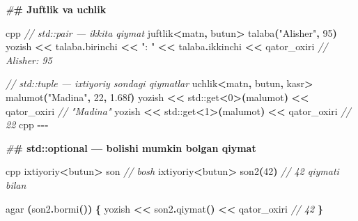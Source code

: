 \documentclass[a4paper,11pt,twoside,openright]{book}
\newenvironment{Shaded}{\begin{snugshade}}{\end{snugshade}}
\newcommand{\BuiltInTok}[1]{#1}
\newcommand{\CommentTok}[1]{\textcolor[rgb]{0.56,0.35,0.01}{\textit{#1}}}
\newcommand{\DecValTok}[1]{\textcolor[rgb]{0.00,0.00,0.81}{#1}}
\newcommand{\ErrorTok}[1]{\textcolor[rgb]{0.64,0.00,0.00}{\textbf{#1}}}
\newcommand{\FloatTok}[1]{\textcolor[rgb]{0.00,0.00,0.81}{#1}}
\newcommand{\NormalTok}[1]{#1}
\newcommand{\OperatorTok}[1]{\textcolor[rgb]{0.81,0.36,0.00}{\textbf{#1}}}
\newcommand{\PreprocessorTok}[1]{\textcolor[rgb]{0.56,0.35,0.01}{\textit{#1}}}
\newcommand{\StringTok}[1]{\textcolor[rgb]{0.31,0.60,0.02}{#1}}
\begin{document}
\begin{Shaded}
\begin{Highlighting}[]
\PreprocessorTok{\#}\ErrorTok{\# Juftlik va uchlik}

\ErrorTok{\textasciigrave{}\textasciigrave{}\textasciigrave{}}\NormalTok{cpp}
\CommentTok{// std::pair — ikkita qiymat}
\NormalTok{juftlik}\OperatorTok{\textless{}}\NormalTok{matn}\OperatorTok{,}\NormalTok{ butun}\OperatorTok{\textgreater{}}\NormalTok{ talaba}\OperatorTok{(}\StringTok{"Alisher"}\OperatorTok{,} \DecValTok{95}\OperatorTok{)}
\NormalTok{yozish }\OperatorTok{\textless{}\textless{}}\NormalTok{ talaba}\OperatorTok{.}\NormalTok{birinchi }\OperatorTok{\textless{}\textless{}} \StringTok{": "} \OperatorTok{\textless{}\textless{}}\NormalTok{ talaba}\OperatorTok{.}\NormalTok{ikkinchi }\OperatorTok{\textless{}\textless{}}\NormalTok{ qator\_oxiri}
\CommentTok{// Alisher: 95}

\CommentTok{// std::tuple — ixtiyoriy sondagi qiymatlar}
\NormalTok{uchlik}\OperatorTok{\textless{}}\NormalTok{matn}\OperatorTok{,}\NormalTok{ butun}\OperatorTok{,}\NormalTok{ kasr}\OperatorTok{\textgreater{}}\NormalTok{ malumot}\OperatorTok{(}\StringTok{"Madina"}\OperatorTok{,} \DecValTok{22}\OperatorTok{,} \FloatTok{1.68}\BuiltInTok{f}\OperatorTok{)}
\NormalTok{yozish }\OperatorTok{\textless{}\textless{}} \BuiltInTok{std::}\NormalTok{get}\OperatorTok{\textless{}}\DecValTok{0}\OperatorTok{\textgreater{}(}\NormalTok{malumot}\OperatorTok{)} \OperatorTok{\textless{}\textless{}}\NormalTok{ qator\_oxiri   }\CommentTok{// "Madina"}
\NormalTok{yozish }\OperatorTok{\textless{}\textless{}} \BuiltInTok{std::}\NormalTok{get}\OperatorTok{\textless{}}\DecValTok{1}\OperatorTok{\textgreater{}(}\NormalTok{malumot}\OperatorTok{)} \OperatorTok{\textless{}\textless{}}\NormalTok{ qator\_oxiri   }\CommentTok{// 22}
\ErrorTok{\textasciigrave{}\textasciigrave{}\textasciigrave{}}\NormalTok{cpp}
\OperatorTok{{-}{-}{-}}

\PreprocessorTok{\#}\ErrorTok{\# \textasciigrave{}std::optional\textasciigrave{} — bo\textquotesingle{}lishi mumkin bo\textquotesingle{}lgan qiymat}

\ErrorTok{\textasciigrave{}\textasciigrave{}\textasciigrave{}}\NormalTok{cpp}
\NormalTok{ixtiyoriy}\OperatorTok{\textless{}}\NormalTok{butun}\OperatorTok{\textgreater{}}\NormalTok{ son     }\CommentTok{// bo\textquotesingle{}sh}
\NormalTok{ixtiyoriy}\OperatorTok{\textless{}}\NormalTok{butun}\OperatorTok{\textgreater{}}\NormalTok{ son2}\OperatorTok{(}\DecValTok{42}\OperatorTok{)}  \CommentTok{// 42 qiymati bilan}

\NormalTok{agar }\OperatorTok{(}\NormalTok{son2}\OperatorTok{.}\NormalTok{bormi}\OperatorTok{())} \OperatorTok{\{}
\NormalTok{    yozish }\OperatorTok{\textless{}\textless{}}\NormalTok{ son2}\OperatorTok{.}\NormalTok{qiymat}\OperatorTok{()} \OperatorTok{\textless{}\textless{}}\NormalTok{ qator\_oxiri   }\CommentTok{// 42}
\OperatorTok{\}}


\end{Highlighting}
\end{Shaded}
\end{document}
